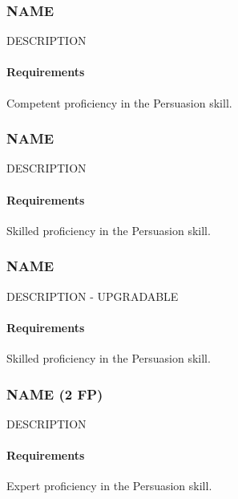 \subsubsection{NAME} \label{feat::name}
    DESCRIPTION
    \paragraph{Requirements} Competent proficiency in the Persuasion skill.
\subsubsection{NAME} \label{feat::name}
    DESCRIPTION
    \paragraph{Requirements} Skilled proficiency in the Persuasion skill.
\subsubsection{NAME} \label{feat::name}
    DESCRIPTION - UPGRADABLE
    \paragraph{Requirements} Skilled proficiency in the Persuasion skill.
\subsubsection{NAME (2 FP)} \label{feat::name}
    DESCRIPTION
    \paragraph{Requirements} Expert proficiency in the Persuasion skill.

